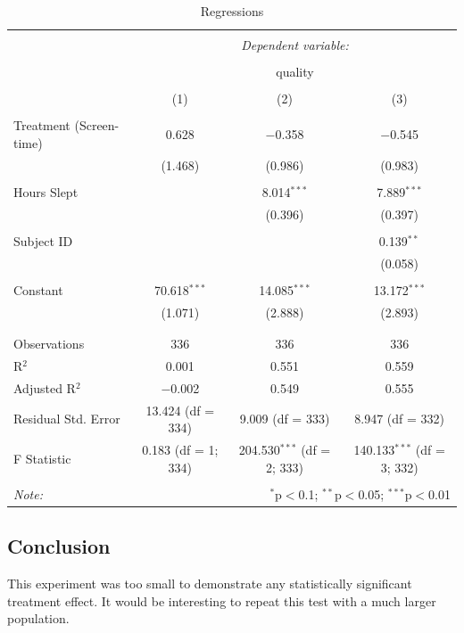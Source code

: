\documentclass[]{article}
\begin{document}
\begin{table}[!htbp] \centering 
  \caption{\label{tab:regressions} Regressions} 
  \label{} 
\begin{tabular}{@{\extracolsep{5pt}}lccc} 
\\[-1.8ex]\hline 
\hline \\[-1.8ex] 
 & \multicolumn{3}{c}{\textit{Dependent variable:}} \\ 
\cline{2-4} 
\\[-1.8ex] & \multicolumn{3}{c}{quality} \\ 
\\[-1.8ex] & (1) & (2) & (3)\\ 
\hline \\[-1.8ex] 
 Treatment (Screen-time) & 0.628 & $-$0.358 & $-$0.545 \\ 
  & (1.468) & (0.986) & (0.983) \\ 
  & & & \\ 
 Hours Slept &  & 8.014$^{***}$ & 7.889$^{***}$ \\ 
  &  & (0.396) & (0.397) \\ 
  & & & \\ 
 Subject ID &  &  & 0.139$^{**}$ \\ 
  &  &  & (0.058) \\ 
  & & & \\ 
 Constant & 70.618$^{***}$ & 14.085$^{***}$ & 13.172$^{***}$ \\ 
  & (1.071) & (2.888) & (2.893) \\ 
  & & & \\ 
\hline \\[-1.8ex] 
Observations & 336 & 336 & 336 \\ 
R$^{2}$ & 0.001 & 0.551 & 0.559 \\ 
Adjusted R$^{2}$ & $-$0.002 & 0.549 & 0.555 \\ 
Residual Std. Error & 13.424 (df = 334) & 9.009 (df = 333) & 8.947 (df = 332) \\ 
F Statistic & 0.183 (df = 1; 334) & 204.530$^{***}$ (df = 2; 333) & 140.133$^{***}$ (df = 3; 332) \\ 
\hline 
\hline \\[-1.8ex] 
\textit{Note:}  & \multicolumn{3}{r}{$^{*}$p$<$0.1; $^{**}$p$<$0.05; $^{***}$p$<$0.01} \\ 
\end{tabular} 
\end{table}

\hypertarget{conclusion}{%
\subsection{Conclusion}\label{conclusion}}

This experiment was too small to demonstrate any statistically
significant treatment effect. It would be interesting to repeat this
test with a much larger population.
\end{document}
